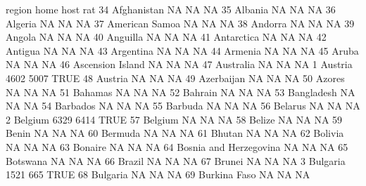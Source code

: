 \documentclass [a4paper] {article}
\begin{document}
\begin{Schunk}
\begin{Soutput}
                                 region  home  host  rat
34                          Afghanistan    NA    NA   NA
35                              Albania    NA    NA   NA
36                              Algeria    NA    NA   NA
37                       American Samoa    NA    NA   NA
38                              Andorra    NA    NA   NA
39                               Angola    NA    NA   NA
40                             Anguilla    NA    NA   NA
41                           Antarctica    NA    NA   NA
42                              Antigua    NA    NA   NA
43                            Argentina    NA    NA   NA
44                              Armenia    NA    NA   NA
45                                Aruba    NA    NA   NA
46                     Ascension Island    NA    NA   NA
47                            Australia    NA    NA   NA
1                               Austria  4602  5007 TRUE
48                              Austria    NA    NA   NA
49                           Azerbaijan    NA    NA   NA
50                               Azores    NA    NA   NA
51                              Bahamas    NA    NA   NA
52                              Bahrain    NA    NA   NA
53                           Bangladesh    NA    NA   NA
54                             Barbados    NA    NA   NA
55                              Barbuda    NA    NA   NA
56                              Belarus    NA    NA   NA
2                               Belgium  6329  6414 TRUE
57                              Belgium    NA    NA   NA
58                               Belize    NA    NA   NA
59                                Benin    NA    NA   NA
60                              Bermuda    NA    NA   NA
61                               Bhutan    NA    NA   NA
62                              Bolivia    NA    NA   NA
63                              Bonaire    NA    NA   NA
64               Bosnia and Herzegovina    NA    NA   NA
65                             Botswana    NA    NA   NA
66                               Brazil    NA    NA   NA
67                               Brunei    NA    NA   NA
3                              Bulgaria  1521   665 TRUE
68                             Bulgaria    NA    NA   NA
69                         Burkina Faso    NA    NA   NA

\end{Soutput}
\end{Schunk}
\end{document}
